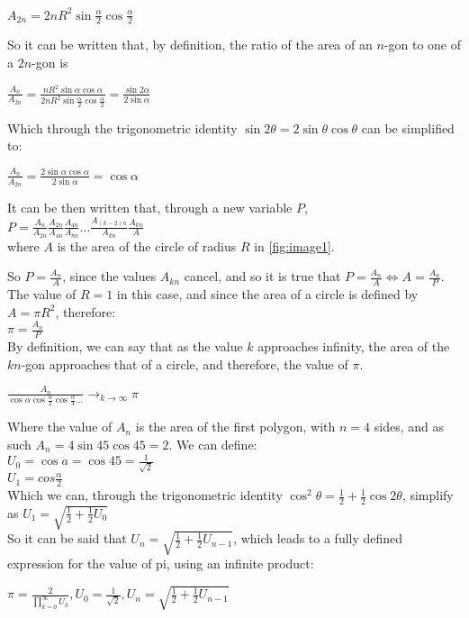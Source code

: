 $A_{2n} = 2n R^2 \sin{\frac{\alpha}{2}} \cos{\frac{\alpha}{2}}$

So it can be written that, by definition, the ratio of 
the area of an $n$-gon to one of a $2n$-gon is

$\frac{A_{n}}{A_{2n}} = \frac{n R^2 \sin{\alpha} \cos{\alpha}}{2 n R^2 \sin{\frac{\alpha}{2}} \cos{\frac{\alpha}{2}}} = \frac{\sin{2 \alpha}}{2 \sin{\alpha}}$

Which through the trigonometric identity $\sin{2 \theta} = 2\sin{\theta} \cos{\theta}$ can 
be simplified to:

$\frac{A_{n}}{A_{2n}} = \frac{2\sin{\alpha} \cos{\alpha} }{2\sin{\alpha}}  = \cos{\alpha}$

It can be then written that, through a new variable $P$, \\
$P = \frac{A_{n}}{A_{2n}} \frac{A_{2n}}{A_{4n}} \frac{A_{4n}}{A_{8n}} \dots \frac{A_{(k-2)n}}{A_{kn}} \frac{A_{kn}}{A}$ \\
where $A$ is the area of the circle of radius $R$ 
in \ref{fig:image1}. 

So $P = \frac{A_{n}}{A}$, since the values $A_{kn}$ cancel, and 
so it is true that $P = \frac{A_{n}}{A} \Leftrightarrow A = \frac{A_{n}}{P}$. The 
value of $R = 1$ in this case, and since the area of a circle is defined 
by $A = \pi R^2$, therefore: \\
$\pi = \frac{A_{n}}{P}$ \\
By definition, we can say that as the value $k$ approaches infinity, the area of the $kn$-gon 
approaches that of a circle, and therefore, the value of $\pi$.

$\frac{A_{n}}{\cos{\alpha} \cos{\frac{\alpha}{2}} \cos{\frac{\alpha}{4}} \dots}
\to_{k \to \infty} \pi$

Where the value of $A_{n}$ is the area of the first polygon, with $n=4$ sides, and as such 
$A_{n} = 4 \sin{45} \cos{45} = 2$. We can define: \\
$U_{0} = \cos{a} = \cos{45} = \frac{1}{\sqrt{2}}$ \\
$U_{1} = cos{\frac{\alpha}{2}}$ \\
Which we can, through the trigonometric identity 
$\cos^2{\theta} = \frac{1}{2} + \frac{1}{2} \cos{2\theta}$, simplify as
$U_{1} = \sqrt{\frac{1}{2} + \frac{1}{2} U_{0}}$ \\
So it can be said that $U_{n} = \sqrt{\frac{1}{2} + \frac{1}{2} U_{n - 1}}$, which leads to 
a fully defined expression for the value of pi, using an infinite product: 

$\pi = \frac{2}{\prod\limits_{k=0}^\infty U_{k}}, U_{0} = \frac{1}{\sqrt{2}}, U_{n} = \sqrt{\frac{1}{2} + \frac{1}{2} U_{n - 1}}$ \footnotemark

